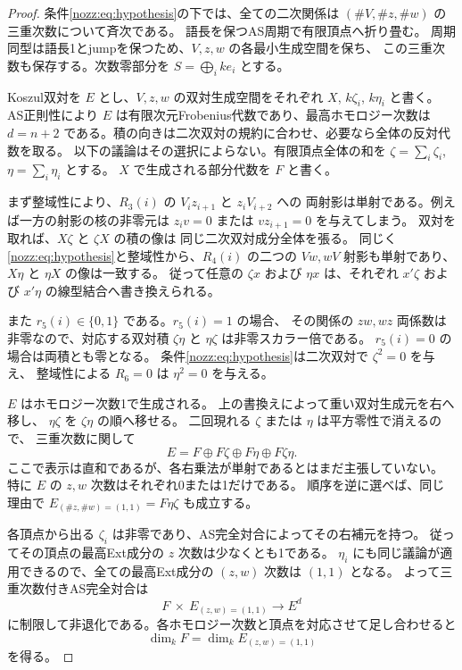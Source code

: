\documentclass[11pt,a4paper]{ltjsarticle}
\theoremstyle{definition}
\begin{document}
\begin{proof}
条件\eqref{nozz:eq:hypothesis}の下では、全ての二次関係は
$(\#V,\#z,\#w)$ の三重次数について斉次である。
語長を保つAS周期で有限頂点へ折り畳む。
周期同型は語長1とjumpを保つため、$V,z,w$ の各最小生成空間を保ち、
この三重次数も保存する。次数零部分を $S=\bigoplus_i ke_i$ とする。

Koszul双対を $E$ とし、$V,z,w$ の双対生成空間をそれぞれ
$X$, $k\zeta_i$, $k\eta_i$ と書く。
AS正則性により $E$ は有限次元Frobenius代数であり、最高ホモロジー次数は
$d=n+2$ である。積の向きは二次双対の規約に合わせ、必要なら全体の反対代数を取る。
以下の議論はその選択によらない。有限頂点全体の和を
$\zeta=\sum_i\zeta_i$, $\eta=\sum_i\eta_i$ とする。
$X$ で生成される部分代数を $F$ と書く。

まず整域性により、$R_3(i)$ の $V_iz_{i+1}$ と $z_iV_{i+2}$ への
両射影は単射である。例えば一方の射影の核の非零元は
$z_iv=0$ または $vz_{i+1}=0$ を与えてしまう。
双対を取れば、$X\zeta$ と $\zeta X$ の積の像は
同じ二次双対成分全体を張る。
同じく\eqref{nozz:eq:hypothesis}と整域性から、$R_4(i)$ の二つの
$Vw,wV$ 射影も単射であり、$X\eta$ と $\eta X$ の像は一致する。
従って任意の $\zeta x$ および $\eta x$ は、それぞれ
$x'\zeta$ および $x'\eta$ の線型結合へ書き換えられる。

また $r_5(i)\in\{0,1\}$ である。$r_5(i)=1$ の場合、
その関係の $zw,wz$ 両係数は非零なので、対応する双対積
$\zeta\eta$ と $\eta\zeta$ は非零スカラー倍である。
$r_5(i)=0$ の場合は両積とも零となる。
条件\eqref{nozz:eq:hypothesis}は二次双対で $\zeta^2=0$ を与え、
整域性による $R_6=0$ は $\eta^2=0$ を与える。

$E$ はホモロジー次数1で生成される。
上の書換えによって重い双対生成元を右へ移し、
$\eta\zeta$ を $\zeta\eta$ の順へ移せる。
二回現れる $\zeta$ または $\eta$ は平方零性で消えるので、
三重次数に関して
\begin{equation}\label{nozz:eq:four-corners}
 E=F\oplus F\zeta\oplus F\eta\oplus F\zeta\eta.
\end{equation}
ここで表示は直和であるが、各右乗法が単射であるとはまだ主張していない。
特に $E$ の $z,w$ 次数はそれぞれ0または1だけである。
順序を逆に選べば、同じ理由で
$E_{(\#z,\#w)=(1,1)}=F\eta\zeta$ も成立する。

各頂点から出る $\zeta_i$ は非零であり、AS完全対合によってその右補元を持つ。
従ってその頂点の最高Ext成分の $z$ 次数は少なくとも1である。
$\eta_i$ にも同じ議論が適用できるので、全ての最高Ext成分の
$(z,w)$ 次数は $(1,1)$ となる。
よって三重次数付きAS完全対合は
\[
 F \ \times\ E_{(z,w)=(1,1)}
 \longrightarrow E^d
\]
に制限して非退化である。各ホモロジー次数と頂点を対応させて足し合わせると
\[
 \dim_k F=\dim_k E_{(z,w)=(1,1)}
\]
を得る。


\end{proof}
\end{document}
